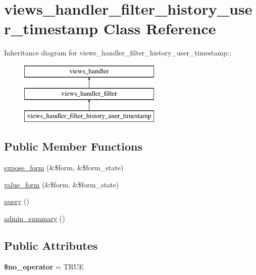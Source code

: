 \hypertarget{classviews__handler__filter__history__user__timestamp}{
\section{views\_\-handler\_\-filter\_\-history\_\-user\_\-timestamp Class Reference}
\label{classviews__handler__filter__history__user__timestamp}
}
Inheritance diagram for views\_\-handler\_\-filter\_\-history\_\-user\_\-timestamp::\begin{figure}[H]
\begin{center}
\leavevmode
\includegraphics[height=3cm]{classviews__handler__filter__history__user__timestamp}
\end{center}
\end{figure}
\subsection*{Public Member Functions}
\begin{DoxyCompactItemize}
\item 
\hyperlink{classviews__handler__filter__history__user__timestamp_a1977bbf7abbeaf89266ae9a7057c7cd7}{expose\_\-form} (\&\$form, \&\$form\_\-state)
\item 
\hyperlink{classviews__handler__filter__history__user__timestamp_a38401d36304bef8a19184a8e7919427f}{value\_\-form} (\&\$form, \&\$form\_\-state)
\item 
\hyperlink{classviews__handler__filter__history__user__timestamp_ac7499e60ca61853a3cd37fcbaa3c0618}{query} ()
\item 
\hyperlink{classviews__handler__filter__history__user__timestamp_aa5eeead15fcc3d6e74ca62c31676e109}{admin\_\-summary} ()
\end{DoxyCompactItemize}
\subsection*{Public Attributes}
\begin{DoxyCompactItemize}
\item 
\hypertarget{classviews__handler__filter__history__user__timestamp_abf922202b8152b4a56464bf0b800cfc0}{
{\bfseries \$no\_\-operator} = TRUE}
\label{classviews__handler__filter__history__user__timestamp_abf922202b8152b4a56464bf0b800cfc0}

\end{DoxyCompactItemize}


